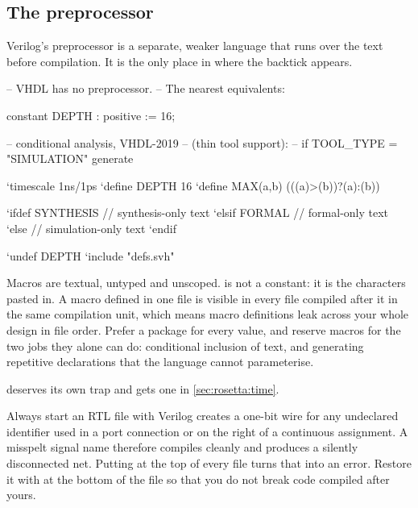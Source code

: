 \subsection{The preprocessor}

Verilog's preprocessor is a separate, weaker language that runs over the text
before compilation. It is the only place in \SV{} where the backtick appears.

\begin{rosetta}
\begin{rleft}
-- VHDL has no preprocessor.
-- The nearest equivalents:

constant DEPTH : positive := 16;

-- conditional analysis, VHDL-2019
-- (thin tool support):
--   if TOOL_TYPE = "SIMULATION" generate
\end{rleft}
\begin{rright}
`timescale 1ns/1ps
`define DEPTH 16
`define MAX(a,b) (((a)>(b))?(a):(b))

`ifdef SYNTHESIS
  // synthesis-only text
`elsif FORMAL
  // formal-only text
`else
  // simulation-only text
`endif

`undef DEPTH
`include "defs.svh"
\end{rright}
\end{rosetta}


Macros are textual, untyped and unscoped.  is not a constant:
it is the characters  pasted in. A macro defined in one file is
visible in every file compiled after it in the same compilation unit, which
means macro definitions leak across your whole design in file order. Prefer a
package  for every value, and reserve macros for the two jobs
they alone can do: conditional inclusion of text, and generating repetitive
declarations that the language cannot parameterise.

 deserves its own trap and gets one in
\cref{sec:rosetta:time}.

\begin{tipbox}{Always start an RTL file with }
Verilog creates a one-bit wire for any undeclared identifier used in a port
connection or on the right of a continuous assignment. A misspelt signal name
therefore compiles cleanly and produces a silently disconnected net. Putting
 at the top of every file turns that into an
error. Restore it with  at the bottom of the
file so that you do not break code compiled after yours.
\end{tipbox}

